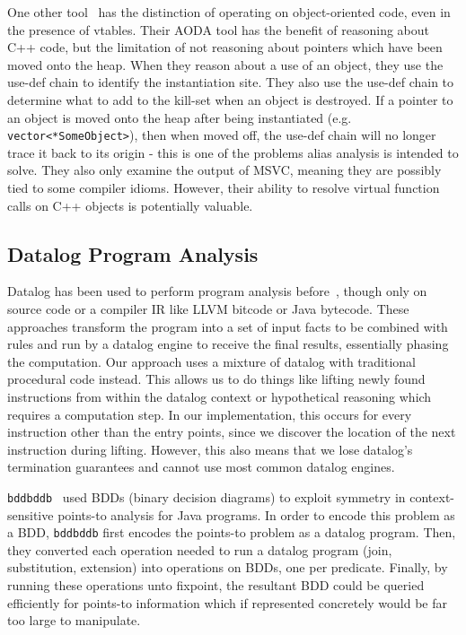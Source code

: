 One other tool~\cite{dewey-uncovering-2015} has the distinction of operating on object-oriented code, even in the presence of vtables.
Their AODA tool has the benefit of reasoning about C++ code, but the limitation of not reasoning about pointers which have been moved onto the heap.
When they reason about a use of an object, they use the use-def chain to identify the instantiation site.
They also use the use-def chain to determine what to add to the kill-set when an object is destroyed.
If a pointer to an object is moved onto the heap after being instantiated (e.g. \texttt{vector<*SomeObject>}), then when moved off, the use-def chain will no longer trace it back to its origin - this is one of the problems alias analysis is intended to solve.
They also only examine the output of MSVC, meaning they are possibly tied to some compiler idioms.
However, their ability to resolve virtual function calls on C++ objects is potentially valuable.

\subsection{Datalog Program Analysis}
Datalog has been used to perform program analysis before~\cite{bddbddb,doop1}, though only on source code or a compiler IR like LLVM bitcode or Java bytecode.
These approaches transform the program into a set of input facts to be combined with rules and run by a datalog engine to receive the final results, essentially phasing the computation.
Our approach uses a mixture of datalog with traditional procedural code instead.
This allows us to do things like lifting newly found instructions from within the datalog context or hypothetical reasoning which requires a computation step.
In our implementation, this occurs for every instruction other than the entry points, since we discover the location of the next instruction during lifting.
However, this also means that we lose datalog's termination guarantees and cannot use most common datalog engines.

\texttt{bddbddb}~\cite{bddbddb} used BDDs (binary decision diagrams) to exploit symmetry in context-sensitive points-to analysis for Java programs.
In order to encode this problem as a BDD, \texttt{bddbddb} first encodes the points-to problem as a datalog program.
Then, they converted each operation needed to run a datalog program (join, substitution, extension) into operations on BDDs, one per predicate.
Finally, by running these operations unto fixpoint, the resultant BDD could be queried efficiently for points-to information which if represented concretely would be far too large to manipulate.

